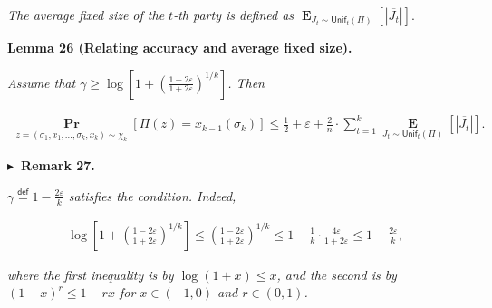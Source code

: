 \emph{The average fixed size of the $t$-th party is defined as
$\operatorname*{\mathbf{E}}_{J_{t}\sim\mathsf{Unif}_{t}(\Pi)}\left[|\overline{J_{t}}|\right].$}\par







\par\medskip\noindent\textbf{
\textbf{Lemma 26}\textbf{ }(Relating accuracy and average fixed size)\textbf{.}
}\par



\emph{Assume that $\gamma\geq\log\left[1+\left(\frac{1-2\varepsilon}{1+2\varepsilon}\right)^{1/k}\right]$.
Then}\par


\[\begin{gathered}
\operatorname*{\mathbf{Pr}}_{z=(\sigma_{1},x_{1},\dots,\sigma_{k},x_{k})\sim\chi_{k}}\left[\Pi(z)=x_{k-1}(\sigma_{k})\right]\leq\frac{1}{2}+\varepsilon+\frac{2}{n}\cdot\sum_{t=1}^{k}\operatorname*{\mathbf{E}}_{J_{t}\sim\mathsf{Unif}_{t}(\Pi)}\left[|\overline{J_{t}}|\right].
\end{gathered}\]







\par\medskip\noindent\textbf{
$\blacktriangleright$ Remark 27.
}\par



$\gamma\stackrel{{\scriptstyle\mathsf{def}}}{{=}}1-\frac{2\varepsilon}{k}$\emph{ satisfies the condition.
Indeed,}\par


\[\begin{gathered}
\log\left[1+\left(\frac{1-2\varepsilon}{1+2\varepsilon}\right)^{1/k}\right]\leq\left(\frac{1-2\varepsilon}{1+2\varepsilon}\right)^{1/k}\leq 1-\frac{1}{k}\cdot\frac{4\varepsilon}{1+2\varepsilon}\leq 1-\frac{2\varepsilon}{k},
\end{gathered}\]


\emph{where the first inequality is by $\log(1+x)\leq x$, and the second is by $(1-x)^{r}\leq 1-rx$ for $x\in(-1,0)$ and $r\in(0,1)$.}\par






